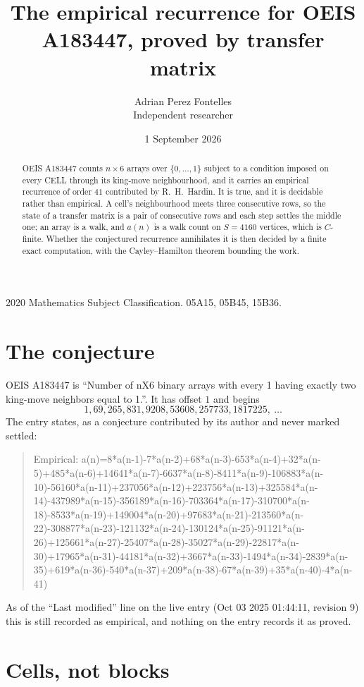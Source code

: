 \documentclass[11pt,a4paper]{article}
\title{The empirical recurrence for OEIS A183447, proved by transfer matrix}
\author{Adrian Perez Fontelles\\ \small Independent researcher}
\date{1 September 2026}
\theoremstyle{plain}
\theoremstyle{definition}
\begin{document}
\maketitle

\begin{abstract}
OEIS A183447 counts $n\times6$ arrays over $\{0,\dots,1\}$ subject to a condition imposed on
every CELL through its king-move neighbourhood, and it carries an empirical recurrence of
order $41$ contributed by R.~H.~Hardin. It is true, and it is decidable rather than
empirical. A cell's neighbourhood meets three consecutive rows, so the state of a transfer
matrix is a pair of consecutive rows and each step settles the middle one; an array is a
walk, and $a(n)$ is a walk count on $S=4160$ vertices, which is $C$-finite. Whether the
conjectured recurrence annihilates it is then decided by a finite exact computation, with the
Cayley--Hamilton theorem bounding the work.
\end{abstract}

\noindent\small 2020 Mathematics Subject Classification. 05A15, 05B45, 15B36.\normalsize

\section{The conjecture}

OEIS A183447 is ``Number of nX6 binary arrays with every 1 having exactly two king-move neighbors equal to 1.''. It has offset $1$ and begins
\[
1, 69, 265, 831, 9208, 53608, 257733, 1817225,\ \dots
\]
The entry states, as a conjecture contributed by its author and never marked settled:
\begin{quote}
Empirical: a(n)=8*a(n-1)-7*a(n-2)+68*a(n-3)-653*a(n-4)+32*a(n-5)+485*a(n-6)+14641*a(n-7)-6637*a(n-8)-8411*a(n-9)-106883*a(n-10)-56160*a(n-11)+237056*a(n-12)+223756*a(n-13)+325584*a(n-14)-437989*a(n-15)-356189*a(n-16)-703364*a(n-17)-310700*a(n-18)-8533*a(n-19)+149004*a(n-20)+97683*a(n-21)-213560*a(n-22)-308877*a(n-23)-121132*a(n-24)-130124*a(n-25)-91121*a(n-26)+125661*a(n-27)-25407*a(n-28)-35027*a(n-29)-22817*a(n-30)+17965*a(n-31)-44181*a(n-32)+3667*a(n-33)-1494*a(n-34)-2839*a(n-35)+619*a(n-36)-540*a(n-37)+209*a(n-38)-67*a(n-39)+35*a(n-40)-4*a(n-41)
\end{quote}
As of the ``Last modified'' line on the live entry (Oct 03 2025 01:44:11, revision 9) this is still
recorded as empirical, and nothing on the entry records it as proved.

\section{Cells, not blocks}
\end{document}
